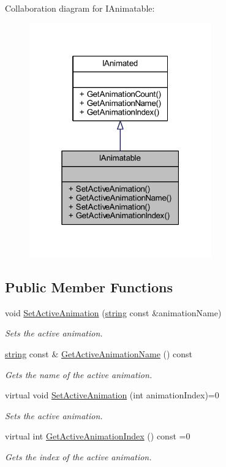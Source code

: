 Collaboration diagram for I\+Animatable\+:\nopagebreak
\begin{figure}[H]
\begin{center}
\leavevmode
\includegraphics[width=223pt]{class_i_animatable__coll__graph}
\end{center}
\end{figure}
\subsection*{Public Member Functions}
\begin{DoxyCompactItemize}
\item 
void \hyperlink{class_i_animatable_a8fc55643f6808cbd37d4656ac58f8581}{Set\+Active\+Animation} (\hyperlink{_types_8h_ad453f9f71ce1f9153fb748d6bb25e454}{string} const \&animation\+Name)
\begin{DoxyCompactList}\small\item\em Sets the active animation. \end{DoxyCompactList}\item 
\hyperlink{_types_8h_ad453f9f71ce1f9153fb748d6bb25e454}{string} const \& \hyperlink{class_i_animatable_a10933b5200d1b8a6c5463921ecf00e0f}{Get\+Active\+Animation\+Name} () const 
\begin{DoxyCompactList}\small\item\em Gets the name of the active animation. \end{DoxyCompactList}\item 
virtual void \hyperlink{class_i_animatable_a7bbd254fa9982deeae933ed0be38764b}{Set\+Active\+Animation} (int animation\+Index)=0
\begin{DoxyCompactList}\small\item\em Sets the active animation. \end{DoxyCompactList}\item 
virtual int \hyperlink{class_i_animatable_aabaf112657c85beabd1639cd99b52274}{Get\+Active\+Animation\+Index} () const  =0
\begin{DoxyCompactList}\small\item\em Gets the index of the active animation. \end{DoxyCompactList}\end{DoxyCompactItemize}


